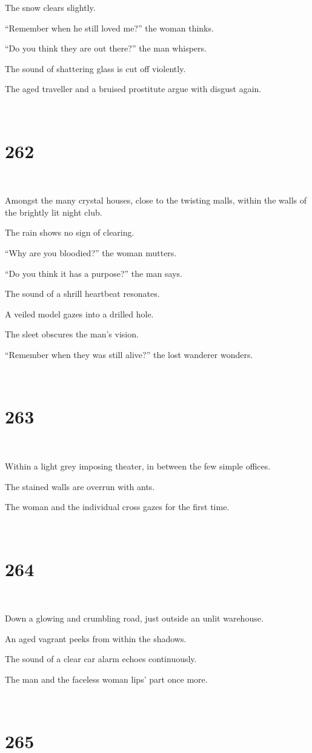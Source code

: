 \documentclass{report}
\begin{document}
The snow clears slightly.

``Remember when he still loved me?'' the woman thinks.

``Do you think they are out there?'' the man whispers.

The sound of shattering glass is cut off violently.

The aged traveller and a bruised prostitute argue with disgust again.

~
\chapter*{262}
~

Amongst the many crystal houses, close to the twisting malls, within the walls of the brightly lit night club.

The rain shows no sign of clearing.

``Why are you bloodied?'' the woman mutters.

``Do you think it has a purpose?'' the man says.

The sound of a shrill heartbeat resonates.

A veiled model gazes into a drilled hole.

The sleet obscures the man's vision.

``Remember when they was still alive?'' the lost wanderer wonders.

~
\chapter*{263}
~

Within a light grey imposing theater, in between the few simple offices.

The stained walls are overrun with ants.

The woman and the individual cross gazes for the first time.

~
\chapter*{264}
~

Down a glowing and crumbling road, just outside an unlit warehouse.

An aged vagrant peeks from within the shadows.

The sound of a clear car alarm echoes continuously.

The man and the faceless woman lips' part once more.

~
\chapter*{265}
~
\end{document}
